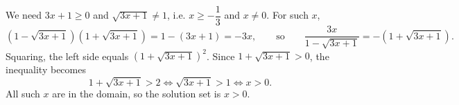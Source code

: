 We need $3x+1\ge0$ and $\sqrt{3x+1}\ne1$, i.e. $x\ge-\dfrac13$ and $x\ne0$. For such $x$,
\[\left(1-\sqrt{3x+1}\right)\left(1+\sqrt{3x+1}\right)=1-(3x+1)=-3x,\qquad\text{so}\qquad\dfrac{3x}{1-\sqrt{3x+1}}=-\left(1+\sqrt{3x+1}\right).\]
Squaring, the left side equals $\left(1+\sqrt{3x+1}\right)^2$. Since $1+\sqrt{3x+1}>0$, the inequality becomes
\[1+\sqrt{3x+1}>2\iff\sqrt{3x+1}>1\iff x>0.\]
All such $x$ are in the domain, so the solution set is $\boxed{x>0}$.
